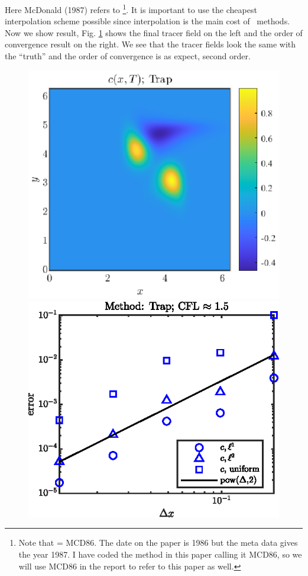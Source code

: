 \documentclass[11pt,letterpaper]{article}
\begin{document}
Here McDonald (1987) refers to \cite{mcdonald1987}\footnote{Note that \cite{mcdonald1987} = MCD86. The date on the paper is 1986 but the meta data gives the year 1987. I have coded the method in this paper calling it MCD86, so we will use MCD86 in the report to refer to this paper as well.}. It is important to use the cheapest interpolation scheme possible since interpolation is the main cost of \sml\ methods. Now we show result, Fig. \ref{fig:c_final_Trap} shows the final tracer field on the left and the order of convergence result on the right. We see that the tracer fields look the same with the ``truth'' and the order of convergence is as expect, second order.
\begin{figure}[H]
    \centering
    \includegraphics{figs/c_final_Trap}
    \includegraphics{figs/conv_order_Trap}
    \caption{}\label{fig:c_final_Trap}
\end{figure}
\end{document}

